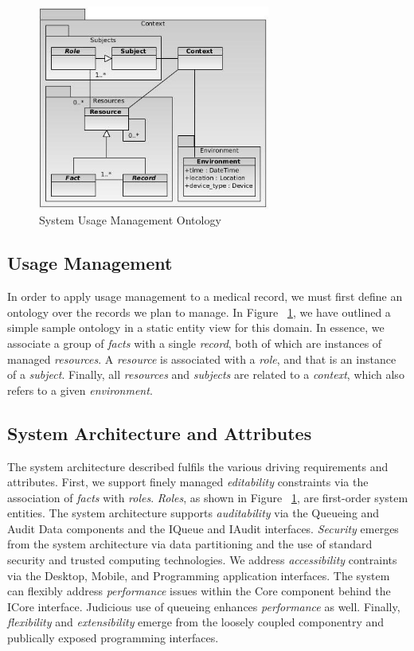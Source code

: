 \documentclass[10pt, conference, compsocconf]{IEEEtran}
\begin{document}
\begin{figure}[!t]
\centering
\includegraphics[width=3in]{UMOntology}
\caption{System Usage Management Ontology}
\label{fig:Ontology}
\end{figure}

\subsection{Usage Management}
In order to apply usage management to a medical record, we must first define an ontology over the records we plan to manage.  In Figure ~\ref{fig:Ontology}, we have outlined a simple sample ontology in a static entity view for this domain.  In essence, we associate a group of \textit{facts} with a single \textit{record}, both of which are instances of managed \textit{resources}.  A \textit{resource} is associated with a \textit{role}, and that is an instance of a \textit{subject}.  Finally, all \textit{resources} and \textit{subjects} are related to a \textit{context}, which also refers to a given \textit{environment}.

\subsection{System Architecture and Attributes}
The system architecture described fulfils the various driving requirements and attributes.  First, we support finely managed \textit{editability} constraints via the association of \textit{facts} with \textit{roles}.  \textit{Roles}, as shown in Figure ~\ref{fig:Ontology}, are first-order system entities.  The system architecture supports \textit{auditability} via the Queueing and Audit Data components and the IQueue and IAudit interfaces.  \textit{Security} emerges from the system architecture via data partitioning and the use of standard security and trusted computing technologies.  We address \textit{accessibility} contraints via the Desktop, Mobile, and Programming application interfaces.  The system can flexibly address \textit{performance} issues within the Core component behind the ICore interface.  Judicious use of queueing enhances \textit{performance} as well.  Finally, \textit{flexibility} and \textit{extensibility} emerge from the loosely coupled componentry and publically exposed programming interfaces.
\end{document}
